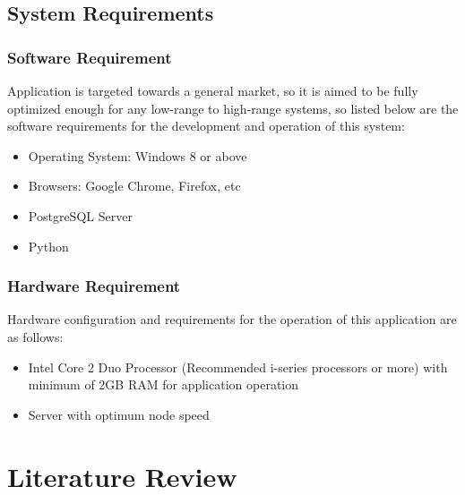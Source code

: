\section{System Requirements}

\subsection{Software Requirement}
Application is targeted towards a general market, 
so it is aimed to be fully optimized enough for any low-range to 
high-range systems, so listed below are 
the software requirements for the development and operation of this system:
\vspace{-18pt}
\begin{itemize}
   \item Operating System: Windows 8 or above 
   \item Browsers: Google Chrome, Firefox, etc
   \item PostgreSQL Server
   \item Python
\end{itemize}

\subsection{Hardware Requirement}
Hardware configuration and requirements for the 
operation of this application are as follows: 
\vspace{-18pt}
\begin{itemize}
   \item Intel Core 2 Duo Processor (Recommended i-series processors or more) with minimum of 2GB RAM for application operation 
   \item Server with optimum node speed
\end{itemize}



\chapter{Literature Review}

